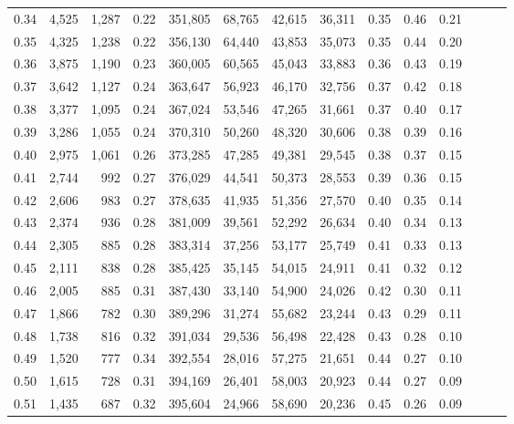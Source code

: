 \begin{tabular}{rrrrrrrrrrrrrr}
0.34 &   4,525 &  1,287 &  0.22 &  351,805 &   68,765 &  42,615 &  36,311 &  0.35 &  0.46 &      0.21 \\
0.35 &   4,325 &  1,238 &  0.22 &  356,130 &   64,440 &  43,853 &  35,073 &  0.35 &  0.44 &      0.20 \\
0.36 &   3,875 &  1,190 &  0.23 &  360,005 &   60,565 &  45,043 &  33,883 &  0.36 &  0.43 &      0.19 \\
0.37 &   3,642 &  1,127 &  0.24 &  363,647 &   56,923 &  46,170 &  32,756 &  0.37 &  0.42 &      0.18 \\
0.38 &   3,377 &  1,095 &  0.24 &  367,024 &   53,546 &  47,265 &  31,661 &  0.37 &  0.40 &      0.17 \\
0.39 &   3,286 &  1,055 &  0.24 &  370,310 &   50,260 &  48,320 &  30,606 &  0.38 &  0.39 &      0.16 \\
0.40 &   2,975 &  1,061 &  0.26 &  373,285 &   47,285 &  49,381 &  29,545 &  0.38 &  0.37 &      0.15 \\
0.41 &   2,744 &    992 &  0.27 &  376,029 &   44,541 &  50,373 &  28,553 &  0.39 &  0.36 &      0.15 \\
0.42 &   2,606 &    983 &  0.27 &  378,635 &   41,935 &  51,356 &  27,570 &  0.40 &  0.35 &      0.14 \\
0.43 &   2,374 &    936 &  0.28 &  381,009 &   39,561 &  52,292 &  26,634 &  0.40 &  0.34 &      0.13 \\
0.44 &   2,305 &    885 &  0.28 &  383,314 &   37,256 &  53,177 &  25,749 &  0.41 &  0.33 &      0.13 \\
0.45 &   2,111 &    838 &  0.28 &  385,425 &   35,145 &  54,015 &  24,911 &  0.41 &  0.32 &      0.12 \\
0.46 &   2,005 &    885 &  0.31 &  387,430 &   33,140 &  54,900 &  24,026 &  0.42 &  0.30 &      0.11 \\
0.47 &   1,866 &    782 &  0.30 &  389,296 &   31,274 &  55,682 &  23,244 &  0.43 &  0.29 &      0.11 \\
0.48 &   1,738 &    816 &  0.32 &  391,034 &   29,536 &  56,498 &  22,428 &  0.43 &  0.28 &      0.10 \\
0.49 &   1,520 &    777 &  0.34 &  392,554 &   28,016 &  57,275 &  21,651 &  0.44 &  0.27 &      0.10 \\
0.50 &   1,615 &    728 &  0.31 &  394,169 &   26,401 &  58,003 &  20,923 &  0.44 &  0.27 &      0.09 \\
0.51 &   1,435 &    687 &  0.32 &  395,604 &   24,966 &  58,690 &  20,236 &  0.45 &  0.26 &      0.09 \\

\end{tabular}
